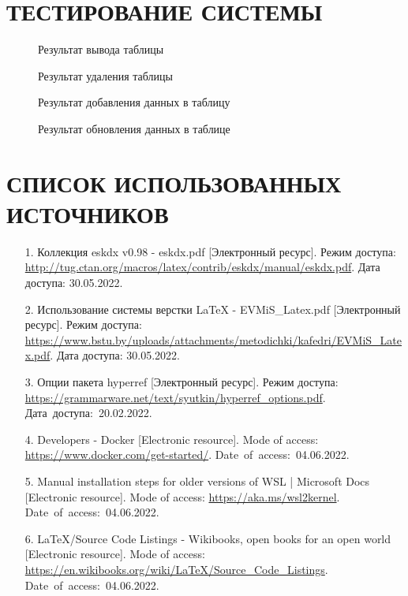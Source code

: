 \documentclass[
  12pt, %
  a4paper, %
  simple, %
  floatsection %
]{eskdtext}
\begin{document}
\newpage
\section{ТЕСТИРОВАНИЕ СИСТЕМЫ}

\begin{figure}[!h]
    \centering
    \caption{Результат вывода таблицы}
\end{figure}

\begin{figure}[!h]
    \centering
    \caption{Результат удаления таблицы}
\end{figure}

\begin{figure}[!h]
    \centering
    \caption{Результат добавления данных в таблицу}
\end{figure}

\begin{figure}[!h]
    \centering
    \caption{Результат обновления данных в таблице}
\end{figure}


\newpage
{}
\section*{СПИСОК ИСПОЛЬЗОВАННЫХ ИСТОЧНИКОВ}
\begin{enumerate}
    \item[1.] Коллекция eskdx v0.98 - eskdx.pdf
    [Электронный ресурс].
    Режим доступа: \url{http://tug.ctan.org/macros/latex/contrib/eskdx/manual/eskdx.pdf}.
    Дата доступа: 30.05.2022.

    \item[2.] Использование системы верстки LaTeX - EVMiS\_Latex.pdf
    [Электронный ресурс].
    Режим доступа: \url{https://www.bstu.by/uploads/attachments/metodichki/kafedri/EVMiS_Latex.pdf}.
    Дата доступа: 30.05.2022.

    \item[3.] Опции пакета hyperref
    [Электронный ресурс].
    Режим доступа: \url{https://grammarware.net/text/syutkin/hyperref_options.pdf}.
    Дата~доступа:~20.02.2022.

    \item[4.] Developers - Docker
    [Electronic resource].
    Mode of access: \url{https://www.docker.com/get-started/}.
    Date~of~access:~04.06.2022.

    \item[5.] Manual installation steps for older versions of WSL | Microsoft Docs
    [Electronic resource].
    Mode of access: \url{https://aka.ms/wsl2kernel}.
    Date~of~access:~04.06.2022.

    \item[6.] LaTeX/Source Code Listings - Wikibooks, open books for an open world
    [Electronic resource].
    Mode of access: \url{https://en.wikibooks.org/wiki/LaTeX/Source_Code_Listings}.
    Date~of~access:~04.06.2022.
\end{enumerate}


\newpage
\end{document}
